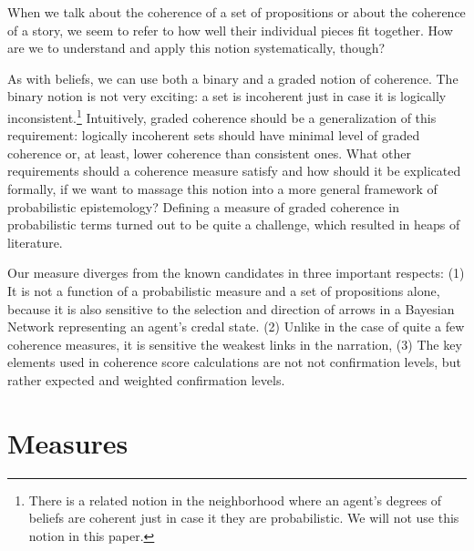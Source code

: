 \documentclass[10pt,]{scrartcl}
\begin{document}

When we talk about the coherence of a set of propositions or about the
coherence of a story, we seem to refer to how well their individual
pieces fit together. How are we to understand and apply this notion
systematically, though?

As with beliefs, we can use both a binary and a graded notion of
coherence. The binary notion is not very exciting: a set is incoherent
just in case it is logically
inconsistent.\footnote{There is a related notion in the neighborhood where an agent's  degrees of beliefs are coherent just in case it they are probabilistic. We will not use this notion in this paper.}
Intuitively, graded coherence should be a generalization of this
requirement: logically incoherent sets should have minimal level of graded coherence or, at least, lower coherence than
consistent ones. What other requirements should a coherence measure
satisfy and how should it be explicated formally, if we want to massage
this notion into a more general framework of probabilistic epistemology?
Defining a measure of graded coherence in probabilistic terms turned out
to be quite a challenge, which resulted in heaps of literature.



Our measure diverges from the known candidates in three important
respects: (1) It is not a function of a probabilistic measure and a set
of propositions alone, because it is also sensitive to the selection and
direction of arrows in a Bayesian Network representing an agent's credal state. (2) Unlike in the case of quite a few coherence measures, it is  sensitive
 the  weakest links in the narration,
(3) The key elements used in coherence score calculations are not  not confirmation levels, but rather
expected and weighted confirmation levels.







\section{Measures}
\end{document}
